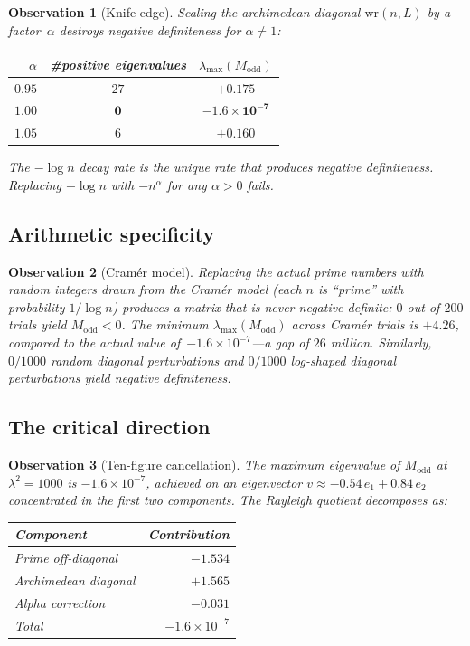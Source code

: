 \documentclass[11pt,a4paper]{article}
\newtheorem{observation}{Observation}
\begin{document}
\begin{observation}[Knife-edge]\label{obs:knife}
Scaling the archimedean diagonal $\mathrm{wr}(n,L)$ by a factor~$\alpha$ destroys negative definiteness for $\alpha \neq 1$:
\begin{center}
\begin{tabular}{rcc}
\toprule
$\alpha$ & \#positive eigenvalues & $\lambda_{\max}(M_{\mathrm{odd}})$ \\
\midrule
$0.95$ & $27$ & $+0.175$ \\
$\mathbf{1.00}$ & $\mathbf{0}$ & $\mathbf{-1.6 \times 10^{-7}}$ \\
$1.05$ & $6$ & $+0.160$ \\
\bottomrule
\end{tabular}
\end{center}
The $-\log n$ decay rate is the \emph{unique} rate that produces negative definiteness. Replacing $-\log n$ with $-n^{\alpha}$ for any $\alpha > 0$ fails.
\end{observation}

\subsection{Arithmetic specificity}

\begin{observation}[Cram\'er model]\label{obs:cramer}
Replacing the actual prime numbers with random integers drawn from the Cram\'er model (each $n$ is ``prime'' with probability $1/\log n$) produces a matrix that is \emph{never} negative definite: $0$ out of $200$ trials yield $M_{\mathrm{odd}} < 0$. The minimum $\lambda_{\max}(M_{\mathrm{odd}})$ across Cram\'er trials is $+4.26$, compared to the actual value of~$-1.6 \times 10^{-7}$---a gap of $26$ million. Similarly, $0/1000$ random diagonal perturbations and $0/1000$ log-shaped diagonal perturbations yield negative definiteness.
\end{observation}

\subsection{The critical direction}

\begin{observation}[Ten-figure cancellation]\label{obs:cancel}
The maximum eigenvalue of $M_{\mathrm{odd}}$ at $\lambda^2 = 1000$ is $-1.6 \times 10^{-7}$, achieved on an eigenvector $v \approx -0.54\, e_1 + 0.84\, e_2$ concentrated in the first two components. The Rayleigh quotient decomposes as:
\begin{center}
\begin{tabular}{lr}
\toprule
Component & Contribution \\
\midrule
Prime off-diagonal & $-1.534$ \\
Archimedean diagonal & $+1.565$ \\
Alpha correction & $-0.031$ \\
\midrule
Total & $-1.6 \times 10^{-7}$ \\
\bottomrule
\end{tabular}
\end{center}
\end{observation}
\end{document}
